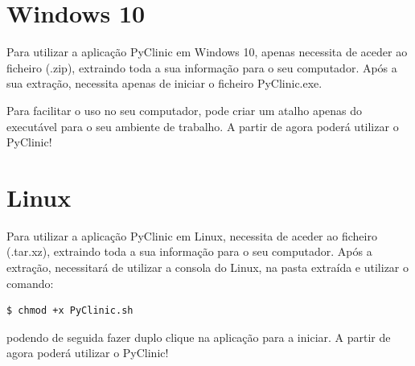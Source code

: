\documentclass[11pt,a4paper,twoside]{article}
\begin{document}
\section{Windows 10}

Para utilizar a aplicação PyClinic em Windows 10, apenas necessita de aceder ao ficheiro (.zip), extraindo toda a sua informação para o seu computador. Após a sua extração, necessita apenas de iniciar o ficheiro PyClinic.exe.

Para facilitar o uso no seu computador, pode criar um atalho apenas do executável para o seu ambiente de trabalho. A partir de agora poderá utilizar o PyClinic!

\section{Linux}

Para utilizar a aplicação PyClinic em Linux, necessita de aceder ao ficheiro (.tar.xz), extraindo toda a sua informação para o seu computador. Após a extração, necessitará de utilizar a consola do Linux, na pasta extraída e utilizar o comando:
\begin{lstlisting}[language=bash]
	$ chmod +x PyClinic.sh
\end{lstlisting}
podendo de seguida fazer duplo clique na aplicação para a iniciar. A partir de agora poderá utilizar o PyClinic!
\end{document}
